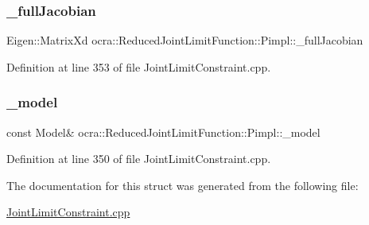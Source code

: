 \subsubsection{\texorpdfstring{\+\_\+full\+Jacobian}{\_fullJacobian}}
{\footnotesize\ttfamily Eigen\+::\+Matrix\+Xd ocra\+::\+Reduced\+Joint\+Limit\+Function\+::\+Pimpl\+::\+\_\+full\+Jacobian}



Definition at line 353 of file Joint\+Limit\+Constraint.\+cpp.

\hypertarget{structReducedJointLimitFunction_1_1Pimpl_abe6f625fec9bf8cff9f847bde9eb9ee2}{}\label{structReducedJointLimitFunction_1_1Pimpl_abe6f625fec9bf8cff9f847bde9eb9ee2} 
\subsubsection{\texorpdfstring{\+\_\+model}{\_model}}
{\footnotesize\ttfamily const Model\& ocra\+::\+Reduced\+Joint\+Limit\+Function\+::\+Pimpl\+::\+\_\+model}



Definition at line 350 of file Joint\+Limit\+Constraint.\+cpp.



The documentation for this struct was generated from the following file\+:\begin{DoxyCompactItemize}
\item 
\hyperlink{JointLimitConstraint_8cpp}{Joint\+Limit\+Constraint.\+cpp}\end{DoxyCompactItemize}
